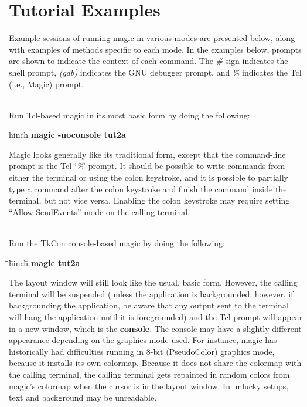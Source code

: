 \documentclass[letterpaper,twoside,12pt]{article}
\def\hinch{\hspace*{0.5in}}
\def\starti{\begin{center}\begin{tabbing}\hinch\=\hinch\=\hinch\=hinch\hinch\=\kill}
\def\endi{\end{tabbing}\end{center}}
\def\ii{\>\>\>}
\begin{document}
\section{Tutorial Examples}

Example sessions of running magic in various modes are presented below,
along with examples of methods specific to each mode.  In the examples
below, prompts are shown to indicate the context of each command.
The {\itshape \#} sign indicates the shell prompt, {\itshape (gdb)}
indicates the GNU debugger prompt, and {\itshape \%} indicates the Tcl
(i.e., Magic) prompt.

\medskip
{} \\

Run Tcl-based magic in its most basic form by doing the following:
\starti
   \ii {\itshape \#} {\bfseries magic -noconsole tut2a} \\
\endi

Magic looks generally like its traditional form, except that the
command-line prompt is the Tcl `{\itshape \%}' prompt.  It should be
possible to write commands from either the terminal or using the
colon keystroke, and it is possible to partially type a command
after the colon keystroke and finish the command inside the terminal,
but not vice versa.  Enabling the colon keystroke may require setting
``Allow SendEvents'' mode on the calling terminal.

\medskip
{} \\

Run the TkCon console-based magic by doing the following:
\starti
   \ii {\itshape \#} {\bfseries magic tut2a} \\
\endi

The layout window will still look like the usual, basic form.  However,
the calling terminal will be suspended (unless the application is
backgrounded;  however, if backgrounding the application, be aware that
any output sent to the terminal will hang the application until it is
foregrounded) and the Tcl prompt will appear in a new window, which is
the {\bf console}.  The console may have a slightly different appearance
depending on the graphics mode used.  For instance, magic has historically
had difficulties running in 8-bit (PseudoColor) graphics mode, because
it installs its own colormap.  Because it does not share the colormap
with the calling terminal, the calling terminal gets repainted in random
colors from magic's colormap when the cursor is in the layout window.  In
unlucky setups, text and background may be unreadable.
\end{document}
